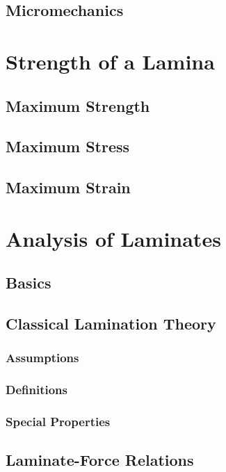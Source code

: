 \documentclass[11pt]{article}
\begin{document}
    \subsection{Micromechanics}

    \section{Strength of a Lamina}

    \subsection{Maximum Strength}

    \subsection{Maximum Stress}

    \subsection{Maximum Strain}

    \section{Analysis of Laminates}

    \subsection{Basics}

    \subsection{Classical Lamination Theory}

    \subsubsection{Assumptions}

    \subsubsection{Definitions}

    \subsubsection{Special Properties}

    \subsection{Laminate-Force Relations}
\end{document}
